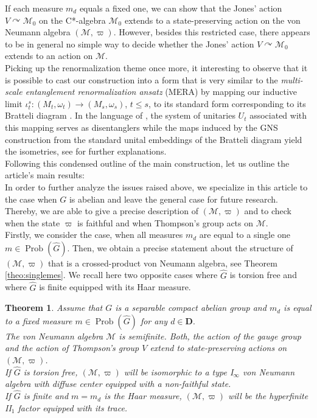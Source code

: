 \documentclass[a4paper,12pt]{amsart}
\numberwithin{equation}{section}
\newtheorem{letterthm}{Theorem}
\theoremstyle{definition}
\newcommand{\act}{\curvearrowright}
\newcommand{\D}{\mathbf D}
\newcommand{\scrM}{\mathscr M}
\DeclareMathOperator{\Prob}{Prob}
\newcommand{\wh}{\widehat}
\begin{document}
If each measure $m_d$ equals a fixed one, we can show that the Jones' action $V\act\scrM_0$ on the C*-algebra $\scrM_0$ extends to a state-preserving action on the von Neumann algebra $(\scrM,\varpi)$. However, besides this restricted case, there appears to be in general no simple way to decide whether the Jones' action $V\act \scrM_0$ extends to an action on $\scrM$.\\[0.1cm]
Picking up the renormalization theme once more, it interesting to observe that it is possible to cast our construction into a form that is very similar to the \textit{multi-scale entanglement renormalization ansatz} (MERA) \cite{Vidal-08-MERA, Evenbly-Vidal-15-TNR, Evenbly-Vidal-16-TNR-MERA} by mapping our inductive limit $\iota_t^s:(M_t, \omega_t)\to (M_s,\omega_s)$, $t\leq s$, to its standard form corresponding to its Bratteli diagram \cite{Evans_Kawahigashi_book}. In the language of \cite{Vidal-08-MERA}, the system of unitaries $U_t$ associated with this mapping serves as disentanglers while the maps induced by the GNS construction from the standard unital embeddings of the Bratteli diagram yield the isometries, see {\cite[Sections 3.4 and 4]{Brot-Stottmeister-Phys}} for further explanations.\\
Following this condensed outline of the main construction, let us outline the article's main results:\\[0.1cm]
In order to further analyze the issues raised above, we specialize in this article to the case when $G$ is abelian and leave the general case for future research. Thereby, we are able to give a precise description of $(\scrM,\varpi)$ and to check when the state $\varpi$ is faithful and when Thompson's group acts on $\scrM$.\\[0.1cm]
Firstly, we consider the case, when all measures $m_d$ are equal to a single one $m\in\Prob(\wh G)$. Then, we obtain a precise statement about the structure of $(\scrM,\varpi)$ that is a crossed-product von Neumann algebra, see Theorem \ref{theo:singlemes}.
We recall here two opposite cases where $\wh G$ is torsion free and where $\wh G$ is finite equipped with its Haar measure. 
\begin{letterthm}\label{theo:intro-I}
Assume that $G$ is a separable compact abelian group and $m_d$ is equal to a fixed measure $m\in\Prob(\wh G)$ for any $d\in\D.$\\
The von Neumann algebra $\scrM$ is semifinite.
Both, the action of the gauge group and the action of Thompson's group $V$ extend to state-preserving actions on $(\scrM,\varpi)$.\\
If $\wh G$ is torsion free, $(\scrM,\varpi)$ will be isomorphic to a type I$_\infty$ von Neumann algebra with diffuse center equipped with a non-faithful state.\\
If $\wh G$ is finite and $m=m_d$ is the Haar measure, $(\scrM,\varpi)$ will be the hyperfinite II$_1$ factor equipped with its trace.
\end{letterthm}
\end{document}
